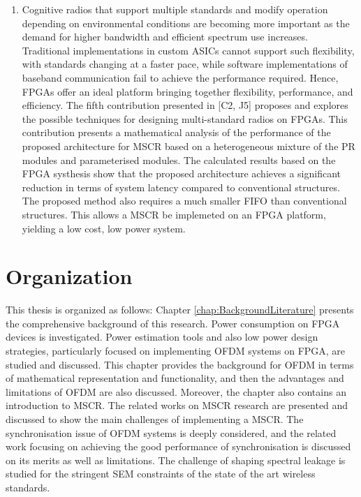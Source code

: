 \begin{enumerate}
\item Cognitive radios that support multiple standards and modify operation depending on environmental conditions are becoming more important as the demand for higher bandwidth and efficient spectrum use increases. 
Traditional implementations in custom ASICs cannot support such flexibility, with standards changing at a faster pace, while software implementations of baseband communication fail to achieve the performance required.
Hence, FPGAs offer an ideal platform bringing together flexibility, performance, and efficiency. 
The fifth contribution presented in [C2, J5] proposes and explores the possible techniques for designing multi-standard radios on FPGAs.
This contribution presents a mathematical analysis of the performance of the proposed architecture for MSCR based on a heterogeneous mixture of the PR modules and parameterised modules.
The calculated results based on the FPGA systhesis show that the proposed architecture achieves a significant reduction in terms of system latency compared to conventional structures.
The proposed method also requires a much smaller FIFO than conventional structures.
This allows a MSCR be implemeted on an FPGA platform, yielding a low cost, low power system.

\end{enumerate}

\section{Organization}

This thesis is organized as follows:
Chapter \ref{chap:BackgroundLiterature} presents the comprehensive background of this research. 
Power consumption on FPGA devices is investigated. 
Power estimation tools and also low power design strategies, particularly focused on implementing OFDM systems on FPGA, are studied and discussed. 
This chapter provides the background for OFDM  in terms of mathematical representation and functionality, and then the advantages and limitations of OFDM are also discussed.
Moreover, the chapter also contains an introduction to MSCR. The related works on MSCR research are presented and discussed to show the main challenges of implementing a MSCR.
The synchronisation issue of OFDM systems is deeply considered, and the related work focusing on achieving the good performance of synchronisation is discussed on its merits as well as limitations.
The challenge of shaping spectral leakage is studied for the stringent SEM constraints of the state of the art wireless standards.

